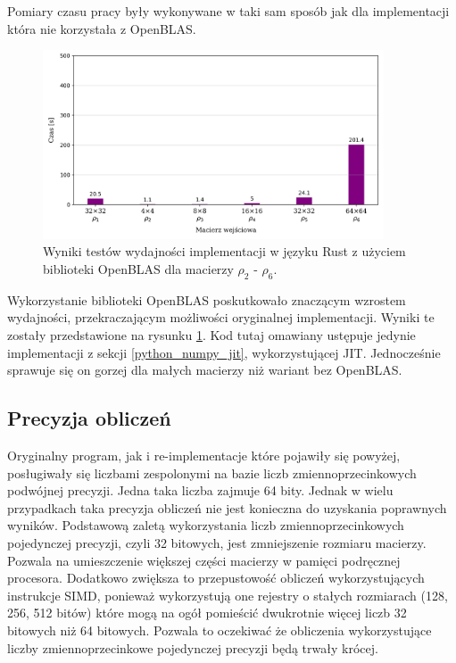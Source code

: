 \documentclass[11pt, a4paper]{article}
\begin{document}
\begin{sloppypar}
    Pomiary czasu pracy były wykonywane w taki sam sposób jak dla implementacji która
    nie korzystała z OpenBLAS.

    \FloatBarrier
    \begin{figure}[ht]
      \centering
      \includegraphics[width=0.9\textwidth]{"resources/rust_blas_perf_tests.png"}
      \caption{Wyniki testów wydajności implementacji w języku Rust z użyciem biblioteki OpenBLAS dla macierzy $\rho
      _{2}$ - $\rho_{6}$.}
      \label{fifth-perf}
    \end{figure}
    \FloatBarrier

    Wykorzystanie biblioteki OpenBLAS poskutkowało znaczącym wzrostem wydajności,
    przekraczającym możliwości oryginalnej implementacji. Wyniki te zostały przedstawione
    na rysunku \ref{fifth-perf}. Kod tutaj omawiany ustępuje jedynie implementacji z
    sekcji \ref{python_numpy_jit}, wykorzystującej JIT. Jednocześnie sprawuje się on
    gorzej dla małych macierzy niż wariant bez OpenBLAS.

    \subsection{Precyzja obliczeń}
    Oryginalny program, jak i re-implementacje które pojawiły się powyżej, posługiwały
    się liczbami zespolonymi na bazie liczb zmiennoprzecinkowych podwójnej precyzji. Jedna
    taka liczba zajmuje 64 bity. Jednak w wielu przypadkach taka precyzja obliczeń nie
    jest konieczna do uzyskania poprawnych wyników. Podstawową zaletą wykorzystania liczb
    zmiennoprzecinkowych pojedynczej precyzji, czyli 32 bitowych, jest zmniejszenie rozmiaru
    macierzy. Pozwala na umieszczenie większej części macierzy w pamięci podręcznej
    procesora. Dodatkowo zwiększa to przepustowość obliczeń wykorzystujących instrukcje SIMD,
    ponieważ wykorzystują one rejestry o stałych rozmiarach (128, 256, 512 bitów) które
    mogą na ogół pomieścić dwukrotnie więcej liczb 32 bitowych niż 64 bitowych. Pozwala to
    oczekiwać że obliczenia wykorzystujące liczby zmiennoprzecinkowe pojedynczej precyzji
    będą trwały krócej.


\end{sloppypar}
\end{document}
